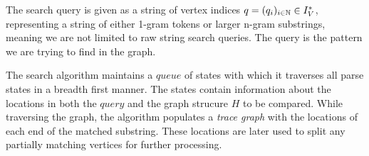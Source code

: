 \noindent The search query is given as a string of vertex indices $q = (q_i)_{i \in \mathbb{N}} \in I_V^*$, representing a string of either 1-gram tokens or larger n-gram substrings, meaning we are not limited to raw string search queries. The query is the pattern we are trying to find in the graph.

\noindent The search algorithm maintains a $queue$ of states with which it traverses all parse states in a breadth first manner. The states contain information about the locations in both the $query$ and the graph strucure $H$ to be compared. While traversing the graph, the algorithm populates a \textit{trace graph} with the locations of each end of the matched substring. These locations are later used to split any partially matching vertices for further processing.


%


